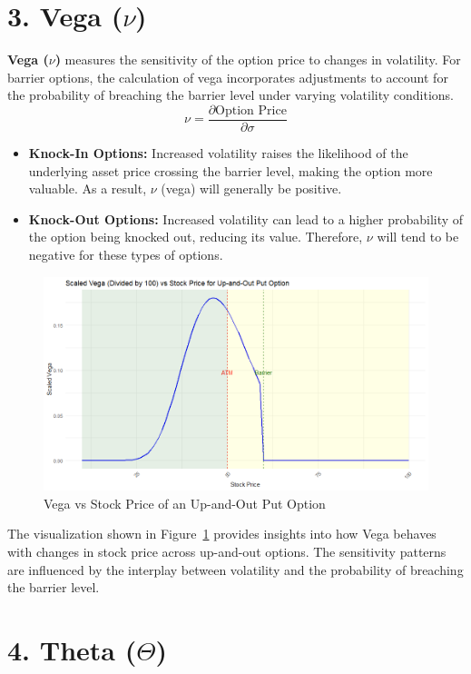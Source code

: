 \section*{3. Vega (\(\nu\))}

\textbf{Vega (\(\nu\))} measures the sensitivity of the option price to changes in volatility. For barrier options, the calculation of vega incorporates adjustments to account for the probability of breaching the barrier level under varying volatility conditions.
\[
\nu = \frac{\partial \text{Option Price}}{\partial \sigma}
\]

\begin{itemize}
    \item \textbf{Knock-In Options:} Increased volatility raises the likelihood of the underlying asset price crossing the barrier level, making the option more valuable. As a result, \(\nu\) (vega) will generally be positive.
    \item \textbf{Knock-Out Options:} Increased volatility can lead to a higher probability of the option being knocked out, reducing its value. Therefore, \(\nu\) will tend to be negative for these types of options.
\end{itemize}

\begin{figure}[h]
    \centering
    \includegraphics[width=.65\linewidth]{content/images/vega.png}
    \caption{Vega vs Stock Price of an Up-and-Out Put Option}
    \label{fig:vega_behavior}
\end{figure}

The visualization shown in Figure~\ref{fig:vega_behavior} provides insights into how Vega behaves with changes in stock price across up-and-out options. The sensitivity patterns are influenced by the interplay between volatility and the probability of breaching the barrier level.




\section*{4. Theta (\(\Theta\))}

